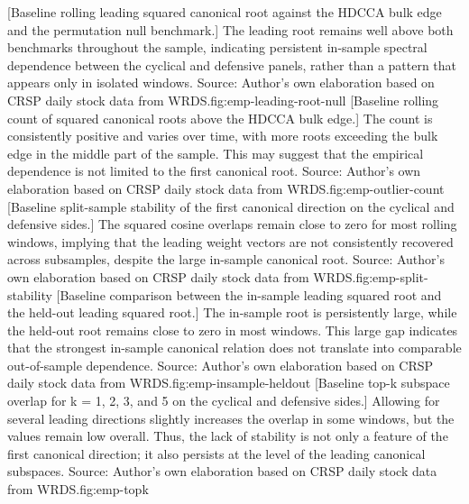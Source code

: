 \documentclass[12pt]{report} %
\begin{document}
[Baseline rolling leading squared canonical root against the HDCCA bulk edge and the permutation null benchmark.]{
The leading root remains well above both benchmarks throughout the sample, indicating persistent in-sample 
spectral dependence between the cyclical and defensive panels, rather than a pattern that appears only in 
isolated windows. Source: Author's own elaboration based on CRSP daily stock data from WRDS.}{fig:emp-leading-root-null}
[Baseline rolling count of squared canonical roots above the HDCCA bulk edge.]{
The count is consistently positive and varies over time, with more roots exceeding the bulk edge in the middle 
part of the sample. This may suggest that the empirical dependence is not limited to the first canonical root. Source: Author's own elaboration based on CRSP daily stock data from WRDS.}{fig:emp-outlier-count}
[Baseline split-sample stability of the first canonical direction on the cyclical and defensive sides.]{
The squared cosine overlaps remain close to zero for most rolling windows, implying that the leading
weight vectors are not consistently recovered across subsamples, despite the large in-sample canonical root. Source: Author's own elaboration based on CRSP daily stock data from WRDS.}{fig:emp-split-stability}
[Baseline comparison between the in-sample leading squared root and the held-out leading squared root.]{
The in-sample root is persistently large, while the held-out root remains close to zero in most windows. 
This large gap indicates that the strongest in-sample canonical relation does not translate into comparable 
out-of-sample dependence. Source: Author's own elaboration based on CRSP daily stock data from WRDS.}{fig:emp-insample-heldout}
[Baseline top-k subspace overlap for k = 1, 2, 3, and 5 on the cyclical and defensive sides.]{
Allowing for several leading directions slightly increases the overlap in some windows, but the values remain low overall. 
Thus, the lack of stability is not only a feature of the first canonical direction; it also persists at the level 
of the leading canonical subspaces. Source: Author's own elaboration based on CRSP daily stock data from WRDS.}{fig:emp-topk}
\end{document}
